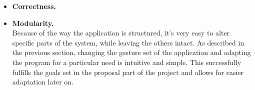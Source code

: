 \documentclass[a4paper,11pt,oneside]{article}
\begin{document}
\begin{itemize}
 \item \textbf{Correctness.} \\
%

\item \textbf{Modularity.} \\
Because of the way the application is structured, it's very easy to alter specific parts of the system, while leaving the others intact. As described in the previous section, changing the gesture set of the application and adapting the program for a particular need is intuitive and simple. This successfully fulfills the goals set in the proposal part of the project and allows for easier adaptation later on.


\end{itemize}
\end{document}
